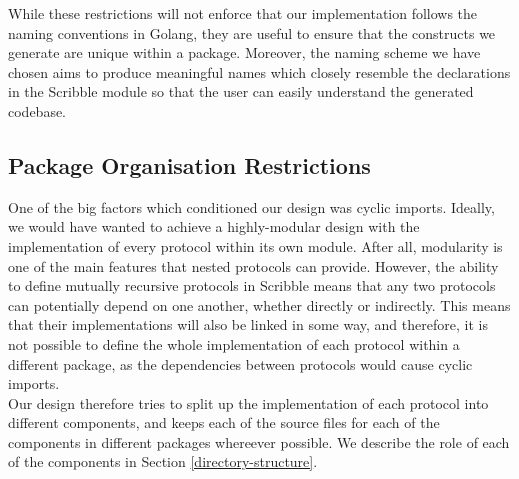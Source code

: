 \documentclass[12pt,twoside]{report}
\begin{document}
While these restrictions will not enforce that our implementation follows the naming conventions in Golang, they are useful to ensure that the constructs we generate are unique within a package. Moreover, the naming scheme we have chosen aims to produce meaningful names which closely resemble the declarations in the Scribble module so that the user can easily understand the generated codebase.

\subsection{Package Organisation Restrictions}\label{package-organisation-restrictions}

One of the big factors which conditioned our design was cyclic imports. Ideally, we would have wanted to achieve a highly-modular design with the implementation of every protocol within its own module. After all, modularity is one of the main features that nested protocols can provide. However, the ability to define mutually recursive protocols in Scribble means that any two protocols can potentially depend on one another, whether directly or indirectly. This means that their implementations will also be linked in some way, and therefore, it is not possible to define the whole implementation of each protocol within a different package, as the dependencies between protocols would cause cyclic imports.\\

Our design therefore tries to split up the implementation of each protocol into different components, and keeps each of the source files for each of the components in different packages whereever possible. We describe the role of each of the components in Section \ref{directory-structure}.




\end{document}
